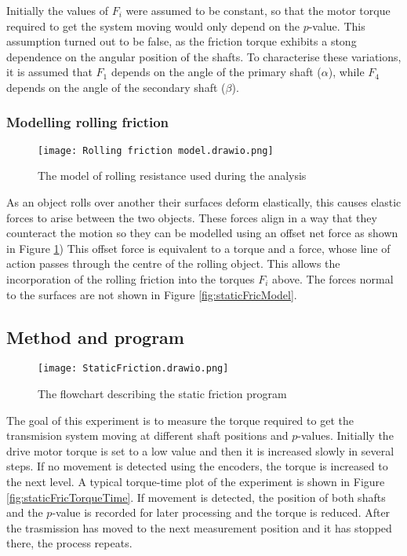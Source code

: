 \documentclass[12pt]{article}
\begin{document}
Initially the values of $F_i$ were assumed to be constant, so that the motor torque required to get the system moving would only depend on the $p$-value. This assumption turned out to be false, as the friction torque exhibits a stong dependence on the angular position of the shafts. To characterise these variations, it is assumed that $F_1$ depends on the angle of the primary shaft ($\alpha$), while $F_4$ depends on the angle of the secondary shaft ($\beta$).



\subsubsection{Modelling rolling friction}
\label{sec:rollingFric}
\begin{figure}[h]
    \centering
    \texttt{[image: Rolling friction model.drawio.png]}
    \caption{The model of rolling resistance used during the analysis}
    \label{fig:rollingFriction}
\end{figure}


As an object rolls over another their surfaces deform elastically, this causes elastic forces to arise between the two objects. These forces align in a way that they counteract the motion so they can be modelled using an offset net force as shown in Figure \ref{fig:rollingFriction}) This offset force is equivalent to a torque and a force, whose line of action passes through the centre of the rolling object. This allows the incorporation of the rolling friction into the torques $F_i$ above. The forces normal to the surfaces are not shown in Figure \ref{fig:staticFricModel}.   





\subsection{Method and program}

\begin{figure}[h]
    \centering
    \texttt{[image: StaticFriction.drawio.png]}
    \caption{The flowchart describing the static friction program}
    \label{fig:staticFricFlowchart}
\end{figure}

The goal of this experiment is to measure the torque required to get the transmision system moving at different shaft positions and $p$-values. Initially the drive motor torque is set to a low value and then it is increased slowly in several steps. If no movement is detected using the encoders, the torque is increased to the next level. A typical torque-time plot of the experiment is shown in Figure \ref{fig:staticFricTorqueTime}. If movement is detected, the position of both shafts and the $p$-value is recorded for later processing and the torque is reduced. After the trasmission has moved to the next measurement position and it has stopped there, the process repeats.\\
\end{document}
